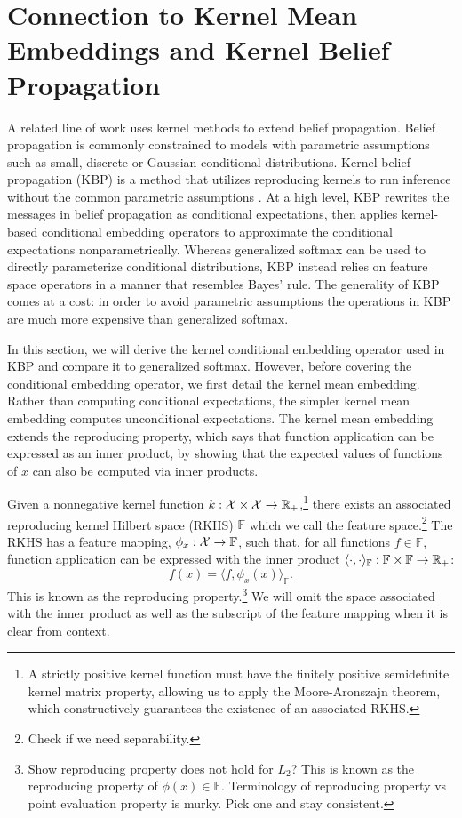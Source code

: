 \documentclass{article}
\begin{document}
\section{Connection to Kernel Mean Embeddings and Kernel Belief Propagation}
A related line of work uses kernel methods to extend belief propagation.
Belief propagation is commonly constrained to models with parametric assumptions such as
small, discrete or Gaussian conditional distributions.
Kernel belief propagation (KBP) is a method that utilizes reproducing kernels
to run inference without the common parametric assumptions \citep{song2010tree,song2011kernelbp}.
At a high level, KBP rewrites the messages in belief propagation as conditional
expectations, then applies kernel-based conditional embedding operators
to approximate the conditional expectations nonparametrically.
Whereas generalized softmax can be used to directly parameterize conditional distributions,
KBP instead relies on feature space operators in a manner that resembles Bayes' rule.
The generality of KBP comes at a cost: in order to avoid parametric assumptions
the operations in KBP are much more expensive than generalized softmax.

In this section, we will derive the kernel conditional embedding operator
used in KBP and compare it to generalized softmax.
However, before covering the conditional embedding operator, we first
detail the kernel mean embedding.
Rather than computing conditional expectations,
the simpler kernel mean embedding computes unconditional expectations.
The kernel mean embedding extends the reproducing property,
which says that function application can be expressed as an inner product,
by showing that the expected values of functions of $x$ can also
be computed via inner products.

Given a nonnegative kernel function $k:\mathcal{X}\times\mathcal{X}\to\mathbb{R}_+$,\footnote{
A strictly positive kernel function must have the finitely positive semidefinite
kernel matrix property, allowing us to apply the Moore-Aronszajn theorem,
which constructively guarantees the existence of an associated RKHS.
}
there exists an associated reproducing kernel Hilbert space (RKHS) $\mathbb{F}$
which we call the feature space.\footnote{
Check if we need separability.
}
The RKHS has a feature mapping, $\phi_x:\mathcal{X}\to\mathbb{F}$,
such that, for all functions $f\in\mathbb{F}$,
function application can be expressed with the inner product
$\langle\cdot,\cdot\rangle_\mathbb{F}:\mathbb{F}\times\mathbb{F}\to\mathbb{R}_+$:
$$f(x) = \langle f, \phi_x(x)\rangle_\mathbb{F}.$$
This is known as the reproducing property.\footnote{
Show reproducing property does not hold for $L_2$?
This is known as the reproducing property of $\phi(x)\in\mathbb{F}$.
Terminology of reproducing property vs point evaluation property is murky.
Pick one and stay consistent.
}
We will omit the space associated with the inner product as
well as the subscript of the feature mapping when it is clear from context.
\end{document}
